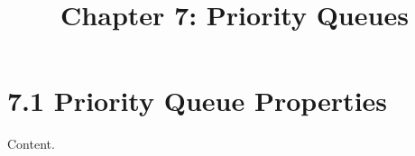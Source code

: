 \documentclass{article}
\title{Chapter 7: Priority Queues}
\begin{document}
\section{7.1 Priority Queue Properties}
Content.
\end{document}

